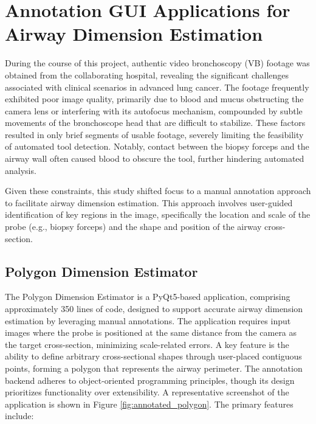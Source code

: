 
\section{Annotation GUI Applications for Airway Dimension Estimation}

During the course of this project, authentic video bronchoscopy (VB) footage was obtained from the collaborating hospital, revealing the significant challenges associated with clinical scenarios in advanced lung cancer. The footage frequently exhibited poor image quality, primarily due to blood and mucus obstructing the camera lens or interfering with its autofocus mechanism, compounded by subtle movements of the bronchoscope head that are difficult to stabilize. These factors resulted in only brief segments of usable footage, severely limiting the feasibility of automated tool detection. Notably, contact between the biopsy forceps and the airway wall often caused blood to obscure the tool, further hindering automated analysis.

Given these constraints, this study shifted focus to a manual annotation approach to facilitate airway dimension estimation. This approach involves user-guided identification of key regions in the image, specifically the location and scale of the probe (e.g., biopsy forceps) and the shape and position of the airway cross-section.

\subsection{Polygon Dimension Estimator}

The Polygon Dimension Estimator is a PyQt5-based application, comprising approximately 350 lines of code, designed to support accurate airway dimension estimation by leveraging manual annotations. The application requires input images where the probe is positioned at the same distance from the camera as the target cross-section, minimizing scale-related errors. A key feature is the ability to define arbitrary cross-sectional shapes through user-placed contiguous points, forming a polygon that represents the airway perimeter. The annotation backend adheres to object-oriented programming principles, though its design prioritizes functionality over extensibility. A representative screenshot of the application is shown in Figure \ref{fig:annotated_polygon}. The primary features include:

